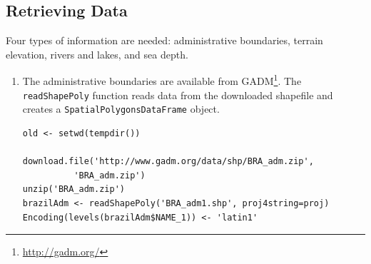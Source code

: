 \documentclass[smallroyalvopaper]{memoir}
\begin{document}
\subsection{Retrieving Data}
\label{sec-1-1}
Four types of information are needed: administrative boundaries,
terrain elevation, rivers and lakes, and sea depth.


\begin{enumerate}
\item The administrative boundaries are available from GADM\footnote{\url{http://gadm.org/}}. The
\texttt{readShapePoly} function reads data from the downloaded shapefile
and creates a \texttt{SpatialPolygonsDataFrame} object.
\lstset{language=R,numbers=none}
\begin{lstlisting}
old <- setwd(tempdir())

download.file('http://www.gadm.org/data/shp/BRA_adm.zip',
	      'BRA_adm.zip')
unzip('BRA_adm.zip')
brazilAdm <- readShapePoly('BRA_adm1.shp', proj4string=proj)
Encoding(levels(brazilAdm$NAME_1)) <- 'latin1'
\end{lstlisting}


\end{enumerate}
\end{document}
